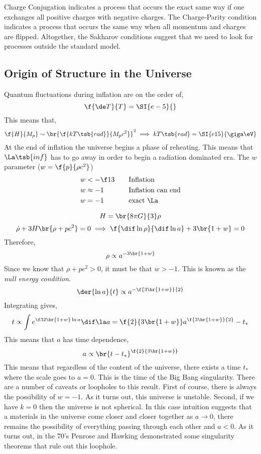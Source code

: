 \documentclass{article}
\begin{document}
Charge Conjugation indicates a process that occurs the exact same way if one exchanges all positive charges with negative charges. The Charge-Parity condition indicates a process that occurs the same way when all momentum and charges are flipped. Altogether, the Sakharov conditions suggest that we need to look for processes outside the standard model.


\subsection{Origin of Structure in the Universe}

Quantum fluctuations during inflation are on the order of,
\[  \f{\de T}{T} = \SI{e-5}{}\]
This means that,
\[ \f{H}{M_p} \sim \br{\f{k T\tsb{rad}}{M_p c^2}}^2 \implies k T\tsb{rad} = \SI{e15}{\giga\eV} \]
At the end of inflation the universe begins a phase of reheating. This means that $\La\tsb{inf}$ has to go away in order to begin a radiation dominated era. The $w$ parameter ($w = \f{p}{\rho c^2}$)
\begin{alignat*}{2}
    w &< -\f13 \quad &&\text{Inflation}\\
    w &\approx -1 \quad &&\text{Inflation can end}\\
    w &= -1 \quad &&\text{exact $\La$}
\end{alignat*}

\[ H = \br{8 \pi G}{3} \rho \]
\[ \dot \rho + 3 H \br{\rho + p c^2} = 0 \implies \f{\dif \ln \rho}{\dif \ln a} + 3 \br{1 + w} = 0 \]
Therefore,
\[ \rho \propto a^{- 3\br{1 + w}} \]
Since we know that $\rho + p c^2 > 0$, it must be that $w > -1$. This is known as the \textit{null energy condition}.
\[ \der{\ln a}{t} \propto a^{- \f{3\br{1 + w}}{2}} \]
Integrating gives,
\[ t \propto \int e^{\f32 \br{1 + w} \ln a} \dif \la a = \f{2}{3 \br{1 + w}} a^{\f{3\br{1 + w}}{2}} - t_{*} \]
This means that $a$ has time dependence,
\[ a \propto \br{t - t_{*}}^{\f{2}{3\br{1 + w}}} \]
This means that regardless of the content of the universe, there exists a time $t_{*}$ where the scale goes to $a = 0$. This is the time of the Big Bang singularity. There are a number of caveats or loopholes to this result. First of course, there is always the possibility of $w = -1$. As it turns out, this universe is unstable. Second, if we have $k = 0$ then the universe is not spherical. In this case intuition suggests that a materials in the universe come closer and closer together as $a \to 0$, there remains the possibility of everything passing through each other and $a < 0$. As it turns out, in the 70's Penrose and Hawking demonstrated some singularity theorems that rule out this loophole. \\
\end{document}
